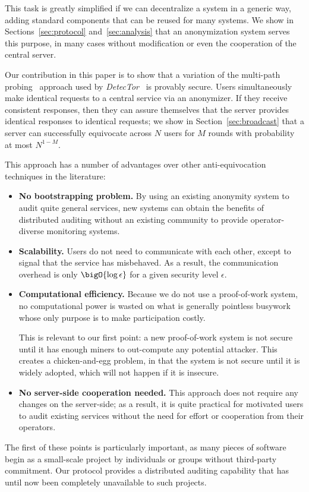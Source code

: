 \documentclass[USenglish]{llncs}
\begin{document}
This task is greatly simplified if we can decentralize a system in a generic
way, adding standard components that can be reused for many systems.  We show
in Sections~\ref{sec:protocol} and~\ref{sec:analysis} that an anonymization system
serves this purpose, in many cases without modification or even the cooperation
of the central server.

Our contribution in this paper is to show that a variation of the
multi-path probing~\cite{wendlandt-tofu} approach
used by \emph{DetecTor}~\cite{detector} is provably secure.
Users simultaneously make identical
requests to a central service via an anonymizer.  If they receive consistent
responses, then they can assure themselves that the server provides
identical responses to identical requests; we show in
Section~\ref{sec:broadcast} that a server can successfully equivocate across
$N$ users for $M$ rounds with probability at most $N^{1-M}$.

This approach has a number of advantages over other anti-equivocation techniques in the literature:
\begin{itemize}
	\item \textbf{No bootstrapping problem.}  By using an existing anonymity system to
		audit quite general services, new systems can obtain the benefits
		of distributed auditing without an existing community to provide operator-diverse
		monitoring systems.
	\item \textbf{Scalability.}  Users do not need to communicate with each other,
		except to signal that the service has misbehaved.  As a result, the communication
		overhead is only $\bigO{\log \epsilon}$ for a given security level $\epsilon$.
	\item \textbf{Computational efficiency.}  Because we do not use a proof-of-work
		system, no computational power is wasted on what is generally pointless busywork
		whose only purpose is to make participation costly.
		
		This is relevant to our first point: a new proof-of-work system is not
		secure until it has enough miners to out-compute any potential attacker.  This
		creates a chicken-and-egg problem, in that the system is not secure until it is
		widely adopted, which will not happen if it is insecure.
	\item \textbf{No server-side cooperation needed.}  This approach does not
		require any changes on the server-side; as a result, it is quite practical for
		motivated users to audit existing services without the need for effort or
		cooperation from their operators.
\end{itemize}
The first of these points is particularly important, as many pieces of
software begin as a small-scale project by individuals
or groups without third-party commitment.  Our protocol provides a distributed
auditing capability that has until now been completely unavailable to such projects.
\end{document}
